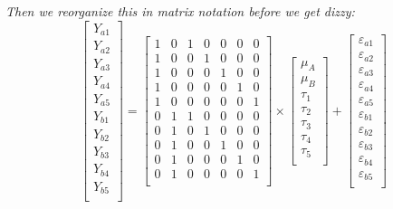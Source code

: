 \documentclass[a4paper,10pt]{article}
\begin{document}
\textit{Then we reorganize this in matrix notation before we get dizzy:}
\begin{displaymath}
\left[\begin{array}{c}
Y_{a1} \\
Y_{a2} \\
Y_{a3} \\
Y_{a4} \\
Y_{a5} \\
Y_{b1} \\
Y_{b2} \\
Y_{b3} \\
Y_{b4} \\
Y_{b5} \\
\end{array}\right]
%
=
%
\left[\begin{array}{ccccccc}1 & 0 & 1 & 0 & 0 & 0 & 0\\ 
			    1 & 0 & 0 & 1 & 0 & 0 & 0\\
			    1 & 0 & 0 & 0 & 1 & 0 & 0\\
			    1 & 0 & 0 & 0 & 0 & 1 & 0\\
			    1 & 0 & 0 & 0 & 0 & 0 & 1\\    
			    0 & 1 & 1 & 0 & 0 & 0 & 0\\
			    0 & 1 & 0 & 1 & 0 & 0 & 0\\
			    0 & 1 & 0 & 0 & 1 & 0 & 0\\
			    0 & 1 & 0 & 0 & 0 & 1 & 0\\
			    0 & 1 & 0 & 0 & 0 & 0 & 1\\ 
\end{array}\right] 
%
\times
%
\left[\begin{array}{c} 
\mu_{A} \\
\mu_{B} \\
\tau_{1} \\
\tau_{2} \\
\tau_{3} \\
\tau_{4} \\
\tau_{5} \\
\end{array}\right] 
%
+ 
%
\left[\begin{array}{c} 
\varepsilon_{a1} \\
\varepsilon_{a2} \\
\varepsilon_{a3} \\
\varepsilon_{a4} \\
\varepsilon_{a5} \\
\varepsilon_{b1} \\
\varepsilon_{b2} \\
\varepsilon_{b3} \\
\varepsilon_{b4} \\
\varepsilon_{b5} \\
\end{array}\right] 
\end{displaymath}
\end{document}
